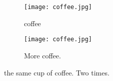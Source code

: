 \documentclass{article}
\begin{document}
	\begin{figure}[h!]
		\centering
		\begin{subfigure}[b]{0.4\linewidth}

	\texttt{[image: coffee.jpg]}
			\caption {coffee}
			\end{subfigure}
		\begin{subfigure}[b]{width=\linewidth}
			\texttt{[image: coffee.jpg]}
			\caption{More coffee.}
			\end{subfigure}
		\caption{the same cup of coffee. Two times.}
		\label{fig:coffee}
	
	\end{figure}
\end{document}
